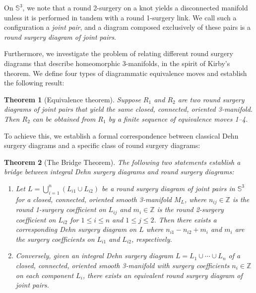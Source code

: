 \documentclass{amsart}
\theoremstyle{plain}
\newtheorem{thm}{Theorem}
\theoremstyle{remark}
\theoremstyle{definition}
\newcommand{\s}{\mathbb{S}}
\begin{document}
On $\s^3$, we note that a round 2-surgery on a knot yields a disconnected manifold unless it is performed in tandem with a round 1-surgery link. We call such a configuration a \emph{joint pair}, and a diagram composed exclusively of these pairs is a \emph{round surgery diagram of joint pairs}.%

Furthermore, we investigate the problem of relating different round surgery diagrams that describe homeomorphic 3-manifolds, in the spirit of Kirby's theorem. We define four types of diagrammatic equivalence moves and establish the following result:

\begin{thm}[Equivalence theorem]\label{thm: EqThm}
Suppose $R_1$ and $R_2$ are two round surgery diagrams of joint pairs that yield the same closed, connected, oriented 3-manifold. Then $R_2$ can be obtained from $R_1$ by a finite sequence of equivalence moves 1--4.
\end{thm}

To achieve this, we establish a formal correspondence between classical Dehn surgery diagrams and a specific class of round surgery diagrams:

\begin{thm}[The Bridge Theorem]\label{BridgeTheorem}
The following two statements establish a bridge between integral Dehn surgery diagrams and round surgery diagrams:
\begin{enumerate}
    \item[(a)] Let $L=\bigcup_{i=1}^{n} (L_{i1} \cup L_{i2})$ be a round surgery diagram of joint pairs in $\mathbb{S}^3$ for a closed, connected, oriented smooth 3-manifold $M_{L}$, where $n_{ij}\in \mathbb{Z}$ is the round 1-surgery coefficient on $L_{ij}$ and $m_i\in \mathbb{Z}$ is the round 2-surgery coefficient on $L_{i2}$ for $1\leq i\leq n$ and $1 \leq j \leq 2$. Then there exists a corresponding Dehn surgery diagram on $L$ where $n_{i1}-n_{i2}+m_i$ and $m_i$ are the surgery coefficients on $L_{i1}$ and $L_{i2}$, respectively.
    \item[(b)] Conversely, given an integral Dehn surgery diagram $L= L_1 \cup \cdots \cup L_n$ of a closed, connected, oriented smooth 3-manifold with surgery coefficients $n_i \in \mathbb{Z}$ on each component $L_i$, there exists an equivalent round surgery diagram of joint pairs.
\end{enumerate}
\end{thm}
\end{document}
